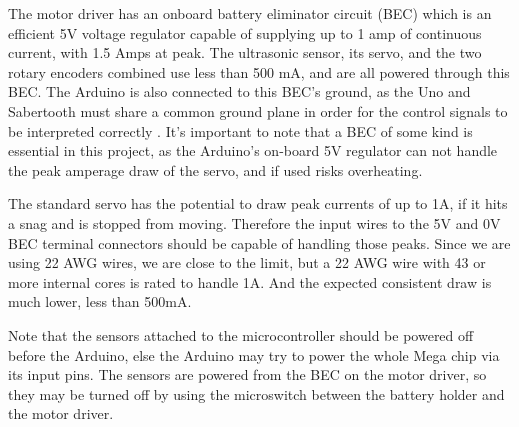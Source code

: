The motor driver has an onboard battery eliminator circuit (BEC) which is an efficient 5V voltage regulator capable of supplying up to 1 amp of continuous current, with 1.5 Amps at peak. The ultrasonic sensor, its servo, and the two rotary encoders combined use less than 500 mA, and are all powered through this BEC.  The Arduino is also connected to this BEC's ground, as the Uno and Sabertooth must share a common ground plane in order for the control signals to be interpreted correctly \cite{sabertoothUserGuide}. It's important to note that a BEC of some kind is essential in this project, as the Arduino's on-board 5V regulator can not handle the peak amperage draw of the servo, and if used risks overheating.

The standard servo has the potential to draw peak currents of up to 1A, if it hits a snag and is stopped from moving. Therefore the input wires to the 5V and 0V BEC terminal connectors should be capable of handling those peaks. Since we are using 22 AWG wires, we are close to the limit, but a 22 AWG wire with 43 or more internal cores is rated to handle 1A. And the expected consistent draw is much lower, less than 500mA. 

Note that the sensors attached to the microcontroller should be powered off before the Arduino, else the Arduino may try to power the whole Mega chip via its input pins. The sensors are powered from the BEC on the motor driver, so they may be turned off by using the microswitch between the battery holder and the motor driver.


